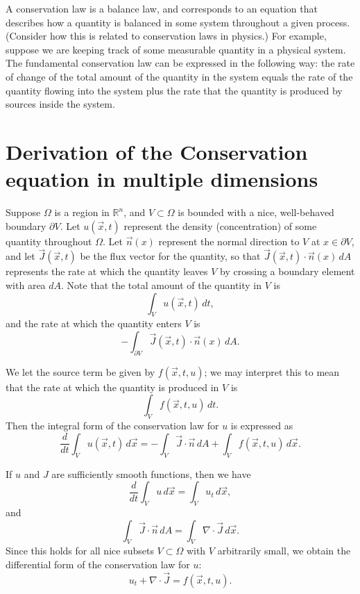 \label{lab:finitedifference1}
A conservation law is a balance law, and corresponds to an equation that describes how a quantity is balanced in some system throughout a given process. (Consider how this is related to conservation laws in physics.) For example, suppose we are keeping track of some measurable quantity in a physical system. The fundamental conservation law can be expressed in the following way: the rate of change of the total amount of the quantity in the system equals the rate of the quantity flowing into the system plus the rate that the quantity is produced by sources inside the system. 


\section{Derivation of the Conservation equation in multiple dimensions}
Suppose $\Omega$ is a region in $\mathbb{R}^n$, and $V \subset \Omega$ is bounded with a nice, 
well-behaved boundary $\partial V$. Let $u(\vec{x},t)$ represent the density (concentration) of some quantity throughout $\Omega$. Let $\vec{n}(x)$ represent the normal direction to $V$ at $x \in \partial V$, and let $\vec{J}(\vec{x},t)$ be the flux vector for the quantity, so that $\vec{J}(\vec{x},t) \cdot \vec{n}(x) \, dA$ represents the rate at which the quantity leaves $V$ by crossing a boundary element with area $dA$. Note that the total amount of the quantity in $V$ is 
\[ \int_V u(\vec{x},t)\, dt,\]
and the rate at which the quantity enters $V$ is 
\[-\int_{\partial V} \vec{J}(\vec{x},t) \cdot \vec{n}(x) \, dA.\]

We let the source term be given by $f(\vec{x},t,u)$; we may interpret this to mean that the 
rate at which the quantity is produced in $V$ is 
\[ \int_V f(\vec{x},t,u)\, dt.\]
Then the integral form of the conservation law for $u$ is expressed as 
\[\frac{d}{dt} \int_V u(\vec{x},t) \, d\vec{x} = -\int_V \vec{J}\cdot \vec{n}\, dA + \int_V f(\vec{x},t,u)\, d\vec{x}  .\]

If $u$ and $J$ are sufficiently smooth functions, then we have 
\[ \frac{d}{dt} \int_V u\, d\vec{x} = \int_V u_t \, d\vec{x} ,\]
and 
\[ \int_V \vec{J}\cdot \vec{n}\, dA = \int_V \nabla \cdot \vec{J}\, d\vec{x} .\]
Since this holds for all nice subsets $V \subset \Omega$ with $V$ arbitrarily small, we obtain 
the differential form of the conservation law for $u$: 
\[ u_t + \nabla \cdot \vec{J} = f(\vec{x},t,u) .\]


